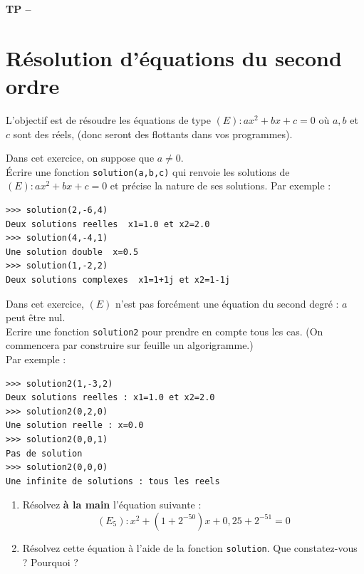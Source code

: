 





\begin{center}
{\Large\bf TP \no {\numero} -- \descrip}
\end{center}



\section{R\' esolution d'\' equations du second ordre}
\noindent L'objectif est de r\' esoudre les \' equations de type $(E)\colon ax^2+bx+c=0$ o\` u $a,b$ et $c$ sont des r\' eels, (donc seront des flottants dans vos programmes).

\begin{exercice}
Dans cet exercice, on suppose que $a\neq 0$.\\
\' Ecrire une fonction \verb?solution(a,b,c)? qui renvoie les solutions de $(E)\colon ax^2+bx+c=0$ et pr\' ecise la nature de ses solutions. Par exemple :
\begin{verbatim}
>>> solution(2,-6,4)
Deux solutions reelles  x1=1.0 et x2=2.0
>>> solution(4,-4,1)
Une solution double  x=0.5
>>> solution(1,-2,2)
Deux solutions complexes  x1=1+1j et x2=1-1j
\end{verbatim}
\end{exercice}


\begin{exercice}
Dans cet exercice, $(E)$ n'est pas forc\' ement une \' equation du second degr\' e : $a$ peut \^ etre nul.\\
Ecrire une fonction \verb?solution2? pour prendre en compte tous les cas. (On commencera par construire sur feuille un algorigramme.)\\
Par exemple :
\begin{verbatim}
>>> solution2(1,-3,2)
Deux solutions reelles : x1=1.0 et x2=2.0
>>> solution2(0,2,0)
Une solution reelle : x=0.0
>>> solution2(0,0,1)
Pas de solution
>>> solution2(0,0,0)
Une infinite de solutions : tous les reels
\end{verbatim}
\end{exercice}


\begin{exercice}
\begin{enumerate}
\item R\' esolvez \textbf{\` a la main} l'\' equation suivante : 
\[(E_5)\colon x^2+(1+2^{-50})x+0,25+2^{-51}=0\]
\item R\' esolvez cette \' equation \` a l'aide de la fonction \verb?solution?. Que constatez-vous ? Pourquoi ?
\end{enumerate}
\end{exercice}


